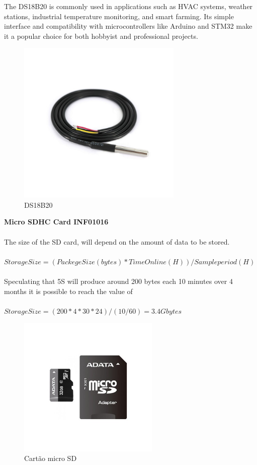 The DS18B20 is commonly used in applications such as HVAC systems, weather
stations, industrial temperature monitoring, and smart farming. Its simple 
interface and compatibility with microcontrollers like Arduino and STM32 
make it a popular choice for both hobbyist and professional projects.

\begin{figure}[H]
    \centering
    \includegraphics[width=0.70\textwidth]{images/chapter/design/components/temp.png}  %
    \caption{DS18B20}
    \label{fig:DS18B20}        
\end{figure}
\textbf{Micro SDHC Card INF01016}\\\\
The size  of the SD card, will depend on the amount of data to be stored.
\\\\
\( Storage Size = (Packege Size(bytes) * Time Online(H))/Sample period(H) \)
\\\\
Speculating that 5S will produce around 200 bytes each 10 minutes over 4 months
it is possible to reach the value of 
\\\\
\( Storage Size = (200 * 4 * 30 * 24)/(10/60) = 3.4Gbytes\)

\begin{figure}[H]
    \centering
    \includegraphics[width=0.6\textwidth]{images/chapter/design/components/sdcard.png}  %
    \caption{Cartão micro SD}
    \label{fig:Cartão micro SD}        
\end{figure}


